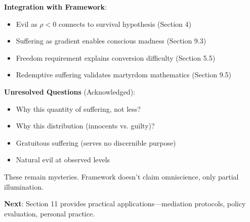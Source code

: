 \documentclass[11pt,a4paper]{article}
\theoremstyle{definition}
\theoremstyle{remark}
\begin{document}
\begin{enumerate}
\begin{mdframed}[backgroundcolor=green!10,linewidth=2pt,linecolor=green!70!black]
\textbf{Integration with Framework}:
\begin{itemize}[nosep]
    \item Evil as \(\rho < 0\) connects to survival hypothesis (Section 4)
    \item Suffering as gradient enables conscious madness (Section 9.3)
    \item Freedom requirement explains conversion difficulty (Section 5.5)
    \item Redemptive suffering validates martyrdom mathematics (Section 9.5)
\end{itemize}

\textbf{Unresolved Questions} (Acknowledged):
\begin{itemize}[nosep]
    \item Why this quantity of suffering, not less?
    \item Why this distribution (innocents vs. guilty)?
    \item Gratuitous suffering (serves no discernible purpose)
    \item Natural evil at observed levels
\end{itemize}

These remain mysteries. Framework doesn't claim omniscience, only partial illumination.

\textbf{Next}: Section 11 provides practical applications—mediation protocols, policy evaluation, personal practice.
\end{mdframed}

\begin{figure}[H]
\centering
{}
\end{figure}
\end{enumerate}
\end{document}
